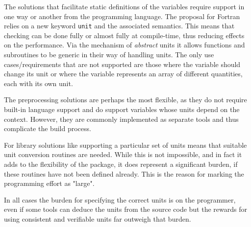 \documentclass{article}
\begin{document}
The solutions that facilitate static definitions of the variables require support in one way or another from the
programming language. The proposal for Fortran \cite{UnitsOfMeasureFortran} relies on a new keyword \verb+unit+ and
the associated semantics. This means that checking can be done fully or almost fully at compile-time, thus reducing effects
on the performance. Via the mechanism of \emph{abstract} units it allows functions and subroutines to be generic in their
way of handling units. The only use cases/requirements that are not supported are those where the variable should change
its unit or where the variable represents an array of different quantities, each with its own unit.

The preprocessing solutions are perhaps the most flexible, as they do not require built-in language support and do
support variables whose units depend on the context. However, they are commonly implemented as separate tools and thus
complicate the build process.

For library solutions like \cite{QuaffFortranPackage} supporting a particular set of units means that suitable unit
conversion routines are needed. While this is not impossible, and in fact it adds to the flexibility of the package,
it does represent a significant burden, if these routines have not been defined already. This is the reason for
marking the programming effort as "large".

In all cases the burden for specifying the correct units is on the programmer, even if some tools can deduce the units from
the source code but the rewards for using consistent and verifiable units far outweigh that burden.
\end{document}
